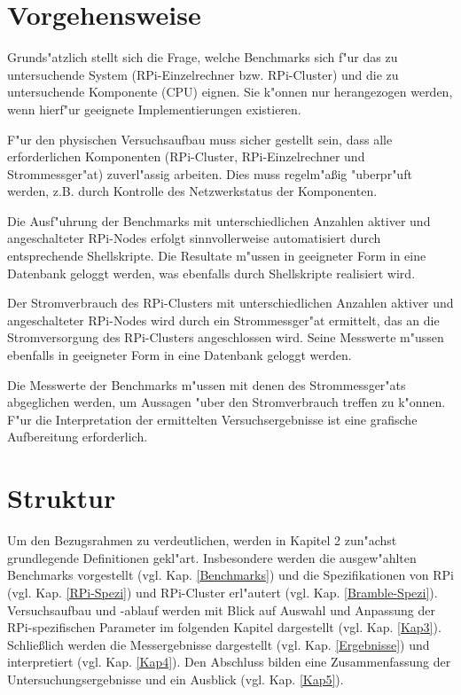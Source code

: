 
\section{Vorgehensweise}\label{Vorgehensweise}

Grunds"atzlich stellt sich die Frage, welche Benchmarks sich f"ur das zu untersuchende System (RPi-Einzelrechner bzw. RPi-Cluster) und die zu untersuchende Komponente (CPU) eignen. Sie k"onnen nur herangezogen werden, wenn hierf"ur geeignete Implementierungen existieren. 

F"ur den physischen Versuchsaufbau muss sicher gestellt sein, dass alle erforderlichen Komponenten (RPi-Cluster, RPi-Einzelrechner und Strommessger"at) zuverl"assig arbeiten. Dies muss regelm"a\ss ig "uberpr"uft werden, z.B. durch Kontrolle des Netzwerkstatus der Komponenten.  

Die Ausf"uhrung der Benchmarks mit unterschiedlichen Anzahlen aktiver und angeschalteter RPi-Nodes erfolgt sinnvollerweise automatisiert durch entsprechende Shellskripte. Die Resultate m"ussen in geeigneter Form in eine Datenbank geloggt werden, was ebenfalls durch Shellskripte realisiert wird. 

Der Stromverbrauch des RPi-Clusters mit unterschiedlichen Anzahlen aktiver und angeschalteter RPi-Nodes wird durch ein Strommessger"at ermittelt, das an die Stromversorgung des RPi-Clusters angeschlossen wird. Seine Messwerte m"ussen ebenfalls in geeigneter Form in eine Datenbank geloggt werden.  

Die Messwerte der Benchmarks m"ussen mit denen des Strommessger"ats abgeglichen werden, um Aussagen "uber den Stromverbrauch treffen zu k"onnen. F"ur die Interpretation der ermittelten Versuchsergebnisse ist eine grafische Aufbereitung erforderlich.

\section{Struktur}\label{Struktur}

Um den Bezugsrahmen zu verdeutlichen, werden in Kapitel 2 zun"achst grundlegende Definitionen gekl"art. Insbesondere werden die ausgew"ahlten Benchmarks vorgestellt (vgl. Kap. \ref{Benchmarks}) und die Spezifikationen von RPi (vgl. Kap. \ref{RPi-Spezi}) und RPi-Cluster erl"autert (vgl. Kap. \ref{Bramble-Spezi}). Versuchsaufbau und -ablauf werden mit Blick auf Auswahl und Anpassung der RPi-spezifischen Parameter im folgenden Kapitel dargestellt (vgl. Kap. \ref{Kap3}). Schlie\ss lich  werden die Messergebnisse dargestellt (vgl. Kap. \ref{Ergebnisse}) und interpretiert (vgl. Kap. \ref{Kap4}). Den Abschluss bilden eine Zusammenfassung der Untersuchungsergebnisse und ein Ausblick (vgl. Kap. \ref{Kap5}).

\endinput 
